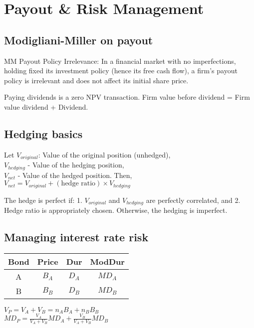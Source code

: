 \section{Payout \& Risk Management}

\subsection*{Modigliani-Miller on payout}

MM Payout Policy Irrelevance: In a financial market with no imperfections,
holding fixed its investment policy (hence its free cash flow), a firm's payout
policy is irrelevant and does not affect its initial share price.

Paying dividends is a zero NPV transaction. Firm value before dividend = Firm value dividend + Dividend.


\subsection*{Hedging basics}

Let $V_{original}$: Value of the original position (unhedged), \\
$V_{hedging}$ - Value of the hedging position, \\
$V_{net}$ -  Value of the hedged position.
Then, \\
$V_{net} = V_{original} + (\text{hedge ratio}) \times V_{hedging} $

The hedge is perfect if: 1. $V_{original}$ and $V_{hedging}$ are perfectly correlated, and 2. Hedge ratio is appropriately chosen.
Otherwise, the hedging is imperfect.


\subsection*{Managing interest rate risk}


\begin{center}
	\begin{tabular}{ |c|c|c|c| } 
		\hline
		Bond & Price & Dur & ModDur \\ 
		\hline
		A & $B_A$ & $D_A$ &  $MD_A$ \\ 
		B & $B_B$ & $D_B$ &  $MD_B$ \\ 
		\hline
	\end{tabular}
\end{center}

$V_P=V_A+V_B = n_AB_A + n_B B_B$ \\
$MD_P = \frac{V_A}{V_A+V_B} MD_A + \frac{V_B}{V_A+V_B}MD_B$ \\

